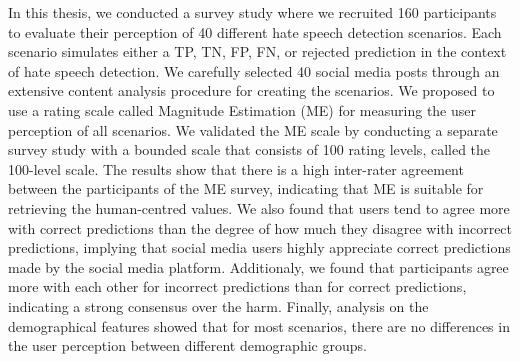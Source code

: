 %
In this thesis, we conducted a survey study where we recruited 160 participants to evaluate their perception of 40 different hate speech detection scenarios.
%
Each scenario simulates either a TP, TN, FP, FN, or rejected prediction in the context of hate speech detection.
%
We carefully selected 40 social media posts through an extensive content analysis procedure for creating the scenarios.
%
We proposed to use a rating scale called Magnitude Estimation (ME) for measuring the user perception of all scenarios.
%
We validated the ME scale by conducting a separate survey study with a bounded scale that consists of 100 rating levels, called the 100-level scale.
%
The results show that there is a high inter-rater agreement between the participants of the ME survey, indicating that ME is suitable for retrieving the human-centred values.
%
We also found that users tend to agree more with correct predictions than the degree of how much they disagree with incorrect predictions, implying that social media users highly appreciate correct predictions made by the social media platform.
%
Additionaly, we found that participants agree more with each other for incorrect predictions than for correct predictions, indicating a strong consensus over the harm.
%
Finally, analysis on the demographical features showed that for most scenarios, there are no differences in the user perception between different demographic groups.
%

